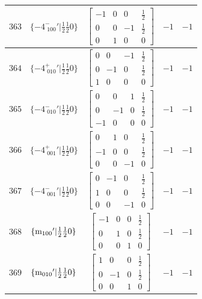 \documentclass[fleqn,8pt]{jsarticle}
\begin{document}
\begin{longtable}{ccccc}
$ 363 $ & $ \{-4^{-}_{\,\,100}{}'|\frac{1}{2} \frac{1}{2} 0\} $ & $ \begin{bmatrix} -1 & 0 & 0 & \frac{1}{2} \\ 0 & 0 & -1 & \frac{1}{2} \\ 0 & 1 & 0 & 0 \end{bmatrix} $ & $ -1 $ & $ -1 $ \\ \hline
$ 364 $ & $ \{-4^{+}_{\,\,010}{}'|\frac{1}{2} \frac{1}{2} 0\} $ & $ \begin{bmatrix} 0 & 0 & -1 & \frac{1}{2} \\ 0 & -1 & 0 & \frac{1}{2} \\ 1 & 0 & 0 & 0 \end{bmatrix} $ & $ -1 $ & $ -1 $ \\ \hline
$ 365 $ & $ \{-4^{-}_{\,\,010}{}'|\frac{1}{2} \frac{1}{2} 0\} $ & $ \begin{bmatrix} 0 & 0 & 1 & \frac{1}{2} \\ 0 & -1 & 0 & \frac{1}{2} \\ -1 & 0 & 0 & 0 \end{bmatrix} $ & $ -1 $ & $ -1 $ \\ \hline
$ 366 $ & $ \{-4^{+}_{\,\,001}{}'|\frac{1}{2} \frac{1}{2} 0\} $ & $ \begin{bmatrix} 0 & 1 & 0 & \frac{1}{2} \\ -1 & 0 & 0 & \frac{1}{2} \\ 0 & 0 & -1 & 0 \end{bmatrix} $ & $ -1 $ & $ -1 $ \\ \hline
$ 367 $ & $ \{-4^{-}_{\,\,001}{}'|\frac{1}{2} \frac{1}{2} 0\} $ & $ \begin{bmatrix} 0 & -1 & 0 & \frac{1}{2} \\ 1 & 0 & 0 & \frac{1}{2} \\ 0 & 0 & -1 & 0 \end{bmatrix} $ & $ -1 $ & $ -1 $ \\ \hline
$ 368 $ & $ \{{\rm m}_{100}{}'|\frac{1}{2} \frac{1}{2} 0\} $ & $ \begin{bmatrix} -1 & 0 & 0 & \frac{1}{2} \\ 0 & 1 & 0 & \frac{1}{2} \\ 0 & 0 & 1 & 0 \end{bmatrix} $ & $ -1 $ & $ -1 $ \\ \hline
$ 369 $ & $ \{{\rm m}_{010}{}'|\frac{1}{2} \frac{1}{2} 0\} $ & $ \begin{bmatrix} 1 & 0 & 0 & \frac{1}{2} \\ 0 & -1 & 0 & \frac{1}{2} \\ 0 & 0 & 1 & 0 \end{bmatrix} $ & $ -1 $ & $ -1 $ \\ \hline

\end{longtable}
\end{document}
